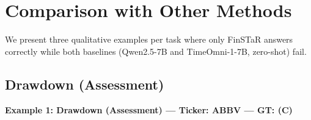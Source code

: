 \clearpage
\section{Comparison with Other Methods}
\label{app:qualitative}

We present three qualitative examples per task where only FinSTaR answers correctly while both baselines (Qwen2.5-7B and TimeOmni-1-7B, zero-shot) fail.

\subsection{Drawdown (Assessment)}


\noindent
\textbf{Example 1: Drawdown (Assessment) --- Ticker: ABBV --- GT: (C)}
\vspace{2pt}

